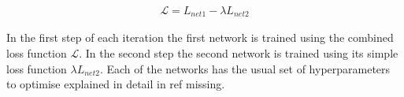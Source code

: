 \begin{align}
    \mathcal{L} = L_{net1} - \lambda L_{net2}
    \label{eq:adversarial_loss}
\end{align}

In the first step of each iteration the first network is trained using the combined loss function $\mathcal{L}$. In the second step the second network is trained using its simple loss function $\lambda L_{net2}$. Each of the networks has the usual set of hyperparameters to optimise explained in detail in ref missing.


